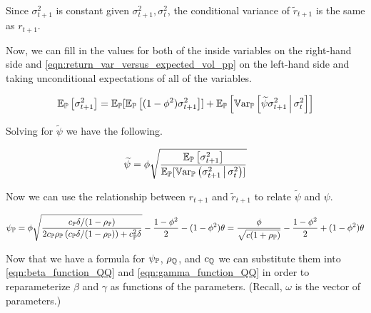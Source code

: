 \documentclass[11pt, letterpaper, twoside, final]{article}
\begin{document}
Since $\sigma^2_{t+1}$ is constant given $\sigma^2_{t+1}, \sigma^2_t$, the conditional variance of
$\widetilde{r}_{t+1}$ is the same as $r_{t+1}$.

Now, we can fill in the values for both of the inside variables on the right-hand side and
\cref{eqn:return_var_versus_expected_vol_pp} on the left-hand side and taking unconditional expectations of all of
the variables.

\begin{equation}
    \operatorname{\mathbb{E}}_{\mathbb{P}}\left[\sigma^2_{t+1} \right]  = \operatorname{\mathbb{E}}_{\mathbb{P}}[ \operatorname{\mathbb{E}}_{\mathbb{P}}\left[(1 - \phi^2) \sigma^2_{t+1} \right]] +
    \operatorname{\mathbb{E}}_{\mathbb{P}}\left[\operatorname{\mathbb{V}ar}_{\mathbb{P}}\left[\widetilde{\psi} \sigma^2_{t+1} \,\middle\vert\, \sigma^2_t\right]\right] 
\end{equation}

Solving for $\widetilde{\psi}$ we have the following.

\begin{equation}
    \widetilde{\psi} = \phi \sqrt{\frac{\operatorname{\mathbb{E}}_{\mathbb{P}}\left[\sigma^2_{t+1} \right]}{\operatorname{\mathbb{E}}_{\mathbb{P}}
    [\operatorname{\mathbb{V}ar}_{\mathbb{P}}\left(\sigma^2_{t+1} \,\middle\vert\, \sigma^2_t\right)]}}  
\end{equation}

Now we can use the relationship between $r_{t+1}$ and $\tilde{r}_{t+1}$ to relate $\tilde{\psi}$ and $\psi$.

\begin{equation}
    \label{eqn:psi_pp_as_func_of_params}
    \psi_{\mathbb{P}} = \phi \sqrt{\frac{c_{\mathbb{P}} \delta / (1 - \rho_{\mathbb{P}})}{2 c_{\mathbb{P}} \rho_{\mathbb{P}} \left(c_{\mathbb{P}} \delta /
    (1 - \rho_{\mathbb{P}})\right) + c_{\mathbb{P}}^2 \delta}} - \frac{1- \phi^2}{2} - (1 - \phi^2) \theta = \frac{\phi}{\sqrt{c
    (1 + \rho_{\mathbb{P}})}} - \frac{1 - \phi^2}{2}  + (1 - \phi^2) \theta
\end{equation}

Now that we have a formula for $\psi_{\mathbb{P}}$, $\rho_{\mathbb{Q}}$, and $c_{\mathbb{Q}}$ we can substitute them into
\cref{eqn:beta_function_QQ}  and \cref{eqn:gamma_function_QQ} in order to reparameterize $\beta$ and $\gamma$ as
functions of the parameters.
(Recall, $\omega$ is the vector of parameters.)
\end{document}
